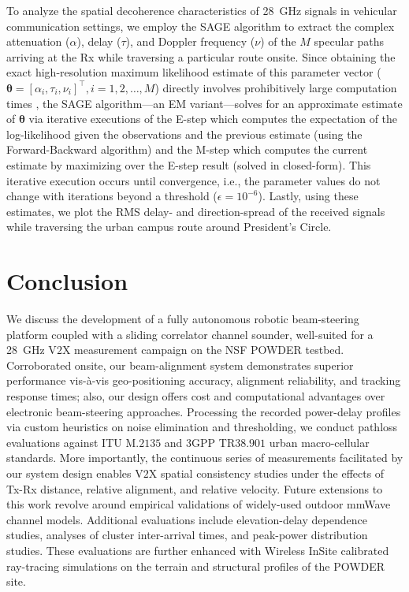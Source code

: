 \documentclass[10pt, twocolumn]{IEEEtran}
\begin{document}
To analyze the spatial decoherence characteristics of \SI{28}{\giga\hertz} signals in vehicular communication settings, we employ the SAGE algorithm \cite{SAGE1} to extract the complex attenuation ($\alpha$), delay ($\tau$), and Doppler frequency ($\nu$) of the $M$ specular paths arriving at the Rx while traversing a particular route onsite. Since obtaining the exact high-resolution maximum likelihood estimate of this parameter vector ($\mathbf{\theta}{=}[\alpha_{i},\tau_{i},\nu_{i}]^{\intercal},i{=}1,2,{\dots},M$) directly involves prohibitively large computation times \cite{SAGE1}, the SAGE algorithm---an EM variant---solves for an approximate estimate of $\mathbf{\theta}$ via iterative executions of the E-step which computes the expectation of the log-likelihood given the observations and the previous estimate (using the Forward-Backward algorithm) and the M-step which computes the current estimate by maximizing over the E-step result (solved in closed-form). This iterative execution occurs until convergence, i.e., the parameter values do not change with iterations beyond a threshold ($\epsilon{=}10^{-6}$). Lastly, using these estimates, we plot the RMS delay- and direction-spread of the received signals while traversing the urban campus route around President's Circle.
\vspace{-5mm}

\section{Conclusion}\label{S5}
\vspace{-2mm}
We discuss the development of a fully autonomous robotic beam-steering platform coupled with a sliding correlator channel sounder, well-suited for a \SI{28}{\giga\hertz} V$2$X measurement campaign on the NSF POWDER testbed. Corroborated onsite, our beam-alignment system demonstrates superior performance vis-\`{a}-vis geo-positioning accuracy, alignment reliability, and tracking response times; also, our design offers cost and computational advantages over electronic beam-steering approaches. Processing the recorded power-delay profiles via custom heuristics on noise elimination and thresholding, we conduct pathloss evaluations against ITU M$.2135$ and $3$GPP TR$38.901$ urban macro-cellular standards. More importantly, the continuous series of measurements facilitated by our system design enables V$2$X spatial consistency studies under the effects of Tx-Rx distance, relative alignment, and relative velocity. Future extensions to this work revolve around empirical validations of widely-used outdoor mmWave channel models. Additional evaluations include elevation-delay dependence studies, analyses of cluster inter-arrival times, and peak-power distribution studies. These evaluations are further enhanced with Wireless InSite calibrated ray-tracing simulations on the terrain and structural profiles of the POWDER site.
\vspace{-5mm}


 
\end{document}
